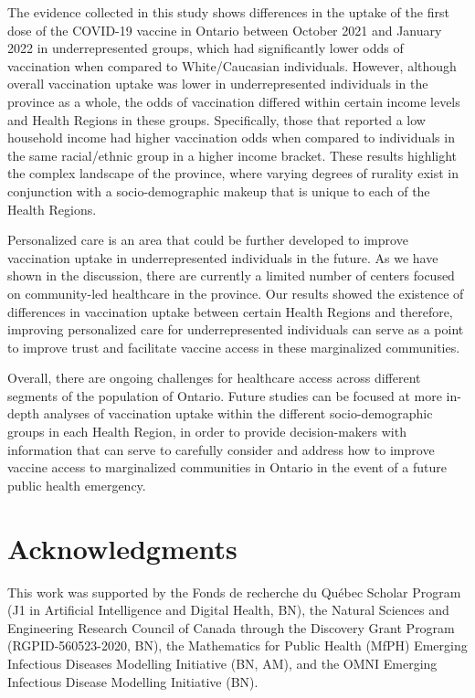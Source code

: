 \documentclass[
]{article}
\begin{document}
The evidence collected in this study shows differences in the uptake of
the first dose of the COVID-19 vaccine in Ontario between October 2021
and January 2022 in underrepresented groups, which had significantly
lower odds of vaccination when compared to White/Caucasian individuals.
However, although overall vaccination uptake was lower in
underrepresented individuals in the province as a whole, the odds of
vaccination differed within certain income levels and Health Regions in
these groups. Specifically, those that reported a low household income
had higher vaccination odds when compared to individuals in the same
racial/ethnic group in a higher income bracket. These results highlight
the complex landscape of the province, where varying degrees of rurality
exist in conjunction with a socio-demographic makeup that is unique to
each of the Health Regions.

Personalized care is an area that could be further developed to improve
vaccination uptake in underrepresented individuals in the future. As we
have shown in the discussion, there are currently a limited number of
centers focused on community-led healthcare in the province. Our results
showed the existence of differences in vaccination uptake between
certain Health Regions and therefore, improving personalized care for
underrepresented individuals can serve as a point to improve trust and
facilitate vaccine access in these marginalized communities.

Overall, there are ongoing challenges for healthcare access across
different segments of the population of Ontario. Future studies can be
focused at more in-depth analyses of vaccination uptake within the
different socio-demographic groups in each Health Region, in order to
provide decision-makers with information that can serve to carefully
consider and address how to improve vaccine access to marginalized
communities in Ontario in the event of a future public health emergency.

\hypertarget{acknowledgments}{%
\section{Acknowledgments}\label{acknowledgments}}

This work was supported by the Fonds de recherche du Québec Scholar
Program (J1 in Artificial Intelligence and Digital Health, BN), the
Natural Sciences and Engineering Research Council of Canada through the
Discovery Grant Program (RGPID-560523-2020, BN), the Mathematics for
Public Health (MfPH) Emerging Infectious Diseases Modelling Initiative
(BN, AM), and the OMNI Emerging Infectious Disease Modelling Initiative
(BN).
\end{document}
